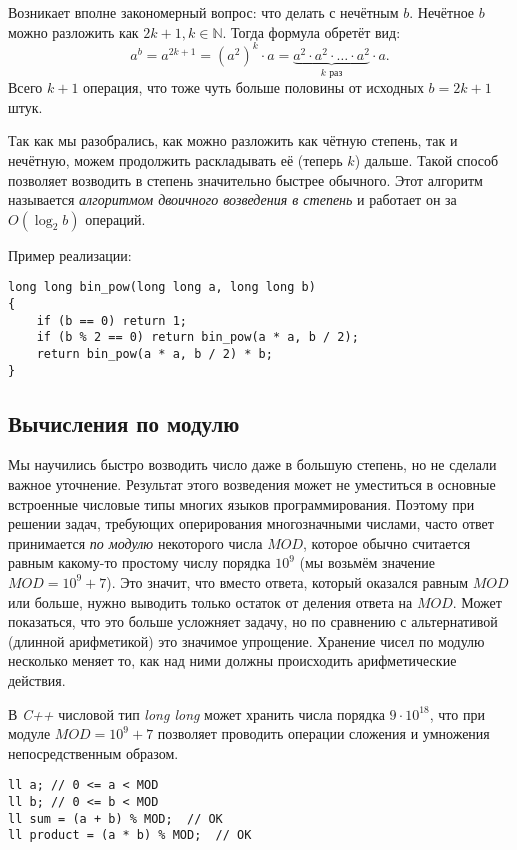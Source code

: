 \documentclass[a4paper,8pt]{article}
\begin{document}
        Возникает вполне закономерный вопрос: что делать с нечётным $b$. Нечётное $b$ можно разложить как $2k + 1, k \in \mathbb{N}$. Тогда формула обретёт вид:
        \[a^b = a^{2k + 1} = (a^{2})^k \cdot a = \underbrace{a^2 \cdot a^2 \cdot \ldots \cdot a^2}_\text{\(k\) раз} \cdot a.\]
        Всего $k + 1$ операция, что тоже чуть больше половины от исходных $b = 2k + 1$ штук.

        Так как мы разобрались, как можно разложить как чётную степень, так и нечётную, можем продолжить раскладывать её (теперь $k$) дальше. Такой способ позволяет возводить в степень значительно быстрее обычного. Этот алгоритм называется \emph{алгоритмом двоичного возведения в степень} и работает он за \(O(\log_2{b})\) операций.

        Пример реализации:
\begin{lstlisting}
long long bin_pow(long long a, long long b)
{
    if (b == 0) return 1;
    if (b % 2 == 0) return bin_pow(a * a, b / 2);
    return bin_pow(a * a, b / 2) * b;
}
\end{lstlisting}
    \subsection{Вычисления по модулю}

    Мы научились быстро возводить число даже в большую степень, но не сделали важное уточнение. Результат этого возведения может не уместиться в основные встроенные числовые типы многих языков программирования. Поэтому при решении задач, требующих оперирования многозначными числами, часто ответ принимается \emph{по модулю} некоторого числа $MOD$, которое обычно считается равным какому-то простому числу порядка $10^9$ (мы возьмём значение $MOD=10^9+7$). Это значит, что вместо ответа, который оказался равным $MOD$ или больше, нужно выводить только остаток от деления ответа на $MOD$. Может показаться, что это больше усложняет задачу, но по сравнению с альтернативой (длинной арифметикой) это значимое упрощение. Хранение чисел по модулю несколько меняет то, как над ними должны происходить арифметические действия.

    В \textit{C++} числовой тип \textit{long long} может хранить числа порядка $9\cdot 10^{18}$, что при модуле $MOD=10^9+7$ позволяет проводить операции сложения и умножения непосредственным образом.
\begin{lstlisting}
ll a; // 0 <= a < MOD
ll b; // 0 <= b < MOD
ll sum = (a + b) % MOD;  // OK
ll product = (a * b) % MOD;  // OK
\end{lstlisting}
\end{document}
